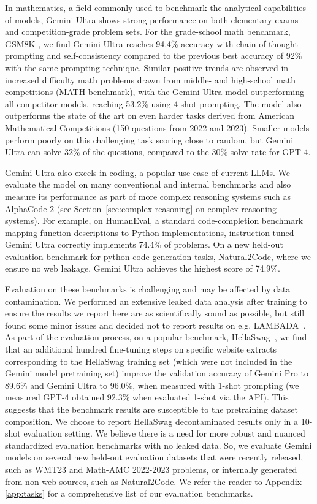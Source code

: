 In mathematics, a field commonly used to benchmark the analytical capabilities of models, Gemini Ultra shows strong performance on both elementary exams and competition-grade problem sets. For the grade-school math benchmark, GSM8K \cite{cobbe2021training}, we find Gemini Ultra reaches 94.4\% accuracy with chain-of-thought prompting and self-consistency \cite{selfconsistency} compared to the previous best accuracy of 92\% with the same prompting technique. Similar positive trends are observed in increased difficulty math problems drawn from middle- and high-school math competitions (MATH benchmark), with the Gemini Ultra model outperforming all competitor models, reaching 53.2\% using 4-shot prompting. The model also outperforms the state of the art on even harder tasks derived from American Mathematical Competitions (150 questions from 2022 and 2023). Smaller models perform poorly on this challenging task scoring close to random, but Gemini Ultra can solve 32\% of the questions, compared to the 30\% solve rate for GPT-4.

Gemini Ultra also excels in coding, a popular use case of current LLMs. We evaluate the model on many conventional and internal benchmarks and also measure its performance as part of more complex reasoning systems such as AlphaCode 2 (see Section~\ref{sec:complex-reasoning} on complex reasoning systems). For example, on HumanEval, a standard code-completion benchmark~\cite{chen2021evaluating} mapping function descriptions to Python implementations, instruction-tuned Gemini Ultra correctly implements 74.4\% of problems. On a new held-out evaluation benchmark for python code generation tasks, Natural2Code, where we ensure no web leakage, Gemini Ultra achieves the highest score of 74.9\%.



Evaluation on these benchmarks is challenging and may be affected by data contamination. We performed an extensive leaked data analysis after training to ensure the results we report here are as scientifically sound as possible, but still found some minor issues and decided not to report results on e.g. LAMBADA~\citep{paperno2016lambada}. As part of the evaluation process, on a popular benchmark, HellaSwag~\cite{zellers2019hellaswag}, we find that an additional hundred fine-tuning steps on specific website extracts corresponding to the HellaSwag training set (which were not included in the Gemini model pretraining set) improve the validation accuracy of Gemini Pro to 89.6\% and Gemini Ultra to 96.0\%, when measured with 1-shot prompting (we measured GPT-4 obtained 92.3\% when evaluated 1-shot via the API). This suggests that the benchmark results are susceptible to the pretraining dataset composition. We choose to report HellaSwag decontaminated results only in a 10-shot evaluation setting. We believe there is a need for more robust and nuanced standardized evaluation benchmarks with no leaked data. So, we evaluate Gemini models on several new held-out evaluation datasets that were recently released, such as WMT23 and Math-AMC 2022-2023 problems, or internally generated from non-web sources, such as Natural2Code. We refer the reader to Appendix \ref{app:tasks} for a comprehensive list of our evaluation benchmarks.


